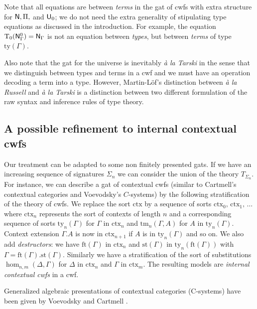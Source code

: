 \documentclass{lmcs}
\newcommand{\Ta}{\mathrm{T}}
\newcommand{\ctx}{\mathrm{ctx}}
\newcommand{\ty}{\mathrm{ty}}
\newcommand{\tm}{\mathrm{tm}}
\begin{document}
\begin{remark}\label{remark:typeequations}
Note that all equations are between {\em terms} in the gat of cwfs with extra structure for $\mathsf{N}, \Pi,$ and $\mathsf{U}_0$; we do not need the extra generality of stipulating type equations as discussed in the introduction. For example, the equation $\Ta_0(\N^0_\Gamma) = \N_\Gamma$ is not an equation between {\em types}, but between {\em terms} of type $\ty(\Gamma)$.
\end{remark}

\begin{remark}
Also note that the gat for the universe is inevitably {\em \`a la Tarski} in the sense that we distinguish between types and terms in a cwf and we must have an operation decoding a term into a type. However, Martin-Löf's distinction between {\em \`a la Russell} and {\em \`a la Tarski} \cite{martinlof:padova} is a distinction between two different formulation of the raw syntax and inference rules of type theory.
\end{remark}

\subsection{A possible refinement to internal contextual cwfs}

Our treatment can be adapted to some non finitely presented gats.
If we have an increasing sequence of signatures $\Sigma_n$ we can consider the
union of the theory $T_{\Sigma_n}$.
For instance, we can describe a gat of contextual cwfs \cite{castellan:lambek} (similar to Cartmell's contextual categories and Voevodsky's $C$-systems) by
the following stratification of the theory of cwfs. We replace the sort $\ctx$
by a sequence of sorts $\ctx_0,\,\ctx_1,\,\dots$ where $\ctx_n$ represents the sort
of contexts of length $n$ and a corresponding sequence of sorts
$\ty_n(\Gamma)$ for $\Gamma$ in $\ctx_n$
and $\tm_n(\Gamma,A)$ for $A$ in $\ty_n(\Gamma)$. Context extension $\Gamma.A$ is now in $\ctx_{n+1}$
if $A$ is in $\ty_n(\Gamma)$ and so on.
We also add {\em destructors}: we have
$\mathrm{ft}(\Gamma)$ in $\ctx_n$
and $\mathrm{st}(\Gamma)$ in $\ty_n(\mathrm{ft}(\Gamma))$
with $\Gamma = \mathrm{ft}(\Gamma).\mathrm{st}(\Gamma)$.
Similarly we have a stratification of the sort of substitutions
$\hom_{n,m}(\Delta,\Gamma)$ for $\Delta$ in $\ctx_n$ and $\Gamma$ in $\ctx_m$.
The resulting models are {\em internal contextual cwfs} in a cwf.

\begin{remark}
Generalized algebraic presentations of contextual categories (C-systems) have been given by Voevodsky \cite{voevodsky:c-systems} and Cartmell \cite{cartmell:gat-contextual}.
\end{remark}
\end{document}
